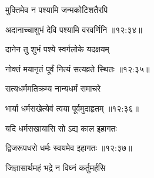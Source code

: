 {\devanagarifont मुक्तिमेव न पश्यामि जन्मकोटिशतैरपि \thinspace{\dandab} \dontdisplaylinenum }%


{\devanagarifont अदानाच्चाशुभं देवि पश्यामि वरवर्णिनि {॥१२:३४॥} \veg\dontdisplaylinenum }%

{\devanagarifont दानेन तु शुभं पश्ये स्वर्गलोके यदक्षयम् \thinspace{\dandab} \dontdisplaylinenum }%


{\devanagarifont नोक्तं मयानृतं पूर्वं नित्यं सत्यव्रते स्थितः {॥१२:३५॥} \veg\dontdisplaylinenum }%

{\devanagarifont सत्यधर्ममतिक्रम्य नान्यधर्मं समाचरे \thinspace{\dandab} \dontdisplaylinenum }%


{\devanagarifont भार्या धर्मसखेत्येवं त्वया पूर्वमुदाहृतम् {॥१२:३६॥} \veg\dontdisplaylinenum }%

{\devanagarifont यदि धर्मसखायासि सो ऽद्य काल इहागतः \thinspace{\dandab} \dontdisplaylinenum }%


{\devanagarifont द्विजरूपधरो धर्मः स्वयमेव इहागतः {॥१२:३७॥} \veg\dontdisplaylinenum }%

{\devanagarifont जिज्ञासार्थमहं भद्रे न विघ्नं कर्तुमर्हसि \thinspace{\dandab} \dontdisplaylinenum }%


